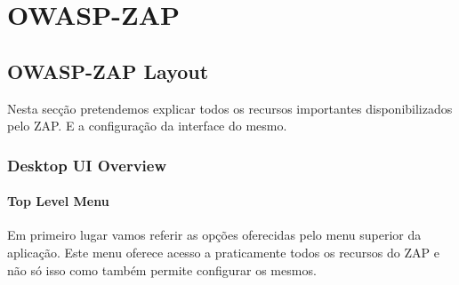 \section{OWASP-ZAP}
\subsection{OWASP-ZAP Layout}

Nesta secção pretendemos explicar todos os recursos importantes disponibilizados pelo ZAP. E a configuração da interface do mesmo.


\subsubsection{Desktop UI Overview}

\paragraph{Top Level Menu}

Em primeiro lugar vamos referir as opções oferecidas pelo menu superior da aplicação. Este menu oferece acesso a praticamente todos os recursos do ZAP e não só isso como também permite configurar os mesmos.

